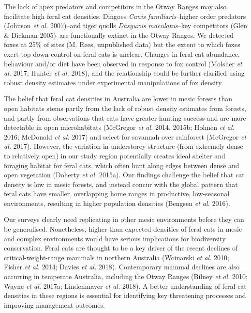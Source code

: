 \documentclass[11pt,a4paper,titlepage,twoside,openright]{style/unimelbthesis}
\begin{document}
\begin{mainmatter}
The lack of apex predators and competitors in the Otway Ranges may also facilitate high feral cat densities. Dingoes \emph{Canis familiaris}--higher order predators (Johnson \emph{et al.} 2007)--and tiger quolls \emph{Dasyurus maculatus}--key competitors (Glen \& Dickman 2005)--are functionally extinct in the Otway Ranges. We detected foxes at 25\% of sites (M. Rees, unpublished data) but the extent to which foxes exert top-down control on feral cats is unclear. Changes in feral cat abundance, behaviour and/or diet have been observed in response to fox control (Molsher \emph{et al.} 2017; Hunter \emph{et al.} 2018), and the relationship could be further clarified using robust density estimates under experimental manipulations of fox density.

The belief that feral cat densities in Australia are lower in mesic forests than open habitats stems partly from the lack of robust density estimates from forests, and partly from observations that cats have greater hunting success and are more detectable in open microhabitats (McGregor \emph{et al.} 2014, 2015b; Hohnen \emph{et al.} 2016; McDonald \emph{et al.} 2017) and select for savannah over rainforest (McGregor \emph{et al.} 2017). However, the variation in understorey structure (from extremely dense to relatively open) in our study region potentially creates ideal shelter and foraging habitat for feral cats, which often hunt along edges between dense and open vegetation (Doherty \emph{et al.} 2015a). Our findings challenge the belief that cat density is low in mesic forests, and instead concur with the global pattern that feral cats have smaller, overlapping home ranges in productive, low-seasonal environments, resulting in higher population densities (Bengsen \emph{et al.} 2016).

Our surveys clearly need replicating in other mesic environments before they can be generalised. Nonetheless, higher than expected densities of feral cats in mesic and complex environments would have serious implications for biodiversity conservation. Feral cats are thought to be a key driver of the recent declines of critical-weight-range mammals in northern Australia (Woinarski \emph{et al.} 2010; Fisher \emph{et al.} 2014; Davies \emph{et al.} 2018). Contemporary mammal declines are also occurring in temperate Australia, including the Otway Ranges (Bilney \emph{et al.} 2010; Wayne \emph{et al.} 2017a; Lindenmayer \emph{et al.} 2018). A better understanding of feral cat densities in these regions is essential for identifying key threatening processes and improving management outcomes.


\end{mainmatter}
\end{document}
